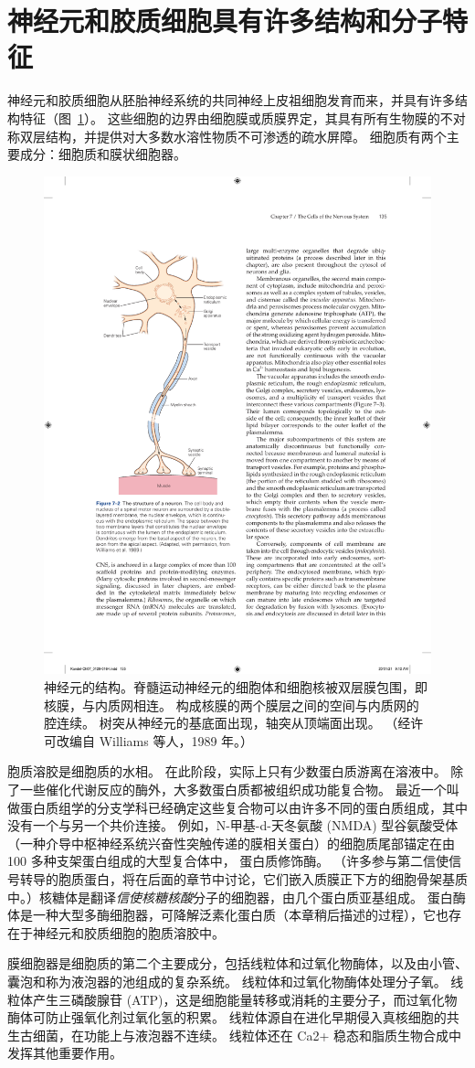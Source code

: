 \section{神经元和胶质细胞具有许多结构和分子特征}

神经元和胶质细胞从胚胎神经系统的共同神经上皮祖细胞发育而来，并具有许多结构特征（图~\ref{fig:7_2}）。
这些细胞的边界由细胞膜或质膜界定，其具有所有生物膜的不对称双层结构，并提供对大多数水溶性物质不可渗透的疏水屏障。
细胞质有两个主要成分：细胞质和膜状细胞器。


\begin{figure}[htbp]
	\centering
	\includegraphics[width=0.5\linewidth]{chap07/fig_7_2}
	\caption{神经元的结构。脊髓运动神经元的细胞体和细胞核被双层膜包围，即核膜，与内质网相连。 构成核膜的两个膜层之间的空间与内质网的腔连续。 树突从神经元的基底面出现，轴突从顶端面出现。 （经许可改编自 Williams 等人，1989 年。）}
	\label{fig:7_2}
\end{figure}


胞质溶胶是细胞质的水相。
在此阶段，实际上只有少数蛋白质游离在溶液中。
除了一些催化代谢反应的酶外，大多数蛋白质都被组织成功能复合物。
最近一个叫做蛋白质组学的分支学科已经确定这些复合物可以由许多不同的蛋白质组成，其中没有一个与另一个共价连接。
例如，N-甲基-d-天冬氨酸 (NMDA) 型谷氨酸受体（一种介导中枢神经系统兴奋性突触传递的膜相关蛋白）的细胞质尾部锚定在由 100 多种支架蛋白组成的大型复合体中， 蛋白质修饰酶。
（许多参与第二信使信号转导的胞质蛋白，将在后面的章节中讨论，它们嵌入质膜正下方的细胞骨架基质中。）核糖体是翻译\textit{信使核糖核酸}分子的细胞器，由几个蛋白质亚基组成。
蛋白酶体是一种大型多酶细胞器，可降解泛素化蛋白质（本章稍后描述的过程），它也存在于神经元和胶质细胞的胞质溶胶中。


膜细胞器是细胞质的第二个主要成分，包括线粒体和过氧化物酶体，以及由小管、囊泡和称为液泡器的池组成的复杂系统。
线粒体和过氧化物酶体处理分子氧。
线粒体产生三磷酸腺苷 (ATP)，这是细胞能量转移或消耗的主要分子，而过氧化物酶体可防止强氧化剂过氧化氢的积累。
线粒体源自在进化早期侵入真核细胞的共生古细菌，在功能上与液泡器不连续。
线粒体还在 Ca2+ 稳态和脂质生物合成中发挥其他重要作用。


